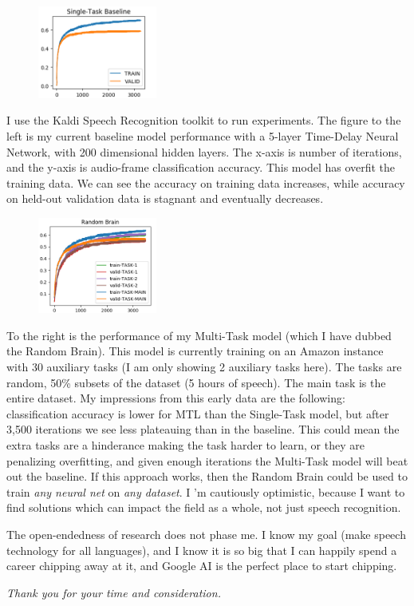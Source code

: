 \documentclass[12pt,a4paper]{article}
\begin{document}
\begin{figure}
\centering
\includegraphics[width=0.35\textwidth]{figs/stl.png}
\end{figure}

 I use the Kaldi Speech Recognition toolkit to run experiments. The figure to the left is my current baseline model performance with a 5-layer Time-Delay Neural Network, with 200 dimensional hidden layers. The x-axis is number of iterations, and the y-axis is audio-frame classification accuracy. This model has overfit the training data. We can see the accuracy on training data increases, while accuracy on held-out validation data is stagnant and eventually decreases. 


\begin{figure}
  \centering
  \includegraphics[width=0.35\textwidth]{figs/mtl.png}
\end{figure}

To the right is the performance of my Multi-Task model (which I have dubbed the Random Brain). This model is currently training on an Amazon instance with 30 auxiliary tasks (I am only showing 2 auxiliary tasks here). The tasks are random, 50\% subsets of the dataset (5 hours of speech). The main task is the entire dataset. My impressions from this early data are the following: classification accuracy is lower for MTL than the Single-Task model, but after 3,500 iterations we see less plateauing than in the baseline. This could mean the extra tasks are a hinderance making the task harder to learn, or they are penalizing overfitting, and given enough iterations the Multi-Task model will beat out the baseline. If this approach works, then the Random Brain could be used to train \textit{any neural net} on \textit{any dataset}. I 'm cautiously optimistic, because I want to find solutions which can impact the field as a whole, not just speech recognition.


The open-endedness of research does not phase me. I know my goal (make speech technology for all languages), and I know it is so big that I can happily spend a career chipping away at it, and Google AI is the perfect place to start chipping. 



\begin{center}
\textit{Thank you for your time and consideration.}  
\end{center}
\end{document}

